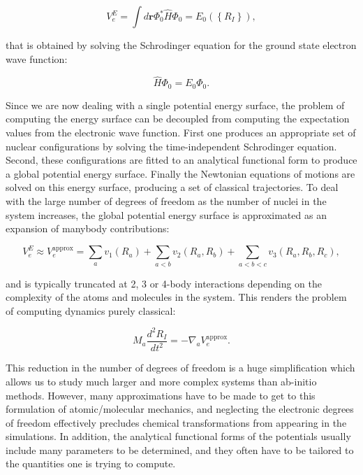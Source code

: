 $$ V_e^E = \int d\bm{r} \Phi_0^* \hat{H} \Phi_0 
    = E_0 \left(\left\{ R_I \right\}\right) , $$

that is obtained by solving the Schrodinger equation
for the ground state electron wave function:

$$ \hat{H} \Phi_0 = E_0 \Phi_0 . $$

Since we are now dealing with a single potential
energy surface, the problem of computing the energy surface
can be decoupled from computing the
expectation values from the electronic wave function.
First one produces an appropriate set of nuclear configurations
by solving the time-independent Schrodinger equation.
Second, these configurations are fitted to an analytical
functional form to produce a global potential energy surface.
Finally the Newtonian equations of motions are solved
on this energy surface, producing a set of classical trajectories.
To deal with the large number of degrees of freedom
as the number of nuclei in the system increases,
the global potential energy surface
is approximated as an expansion of manybody contributions:

$$ V_e^E \approx V_e^{\text{approx}} =
    \sum_a v_1(R_a) + \sum_{a < b} v_2(R_a, R_b)
    + \sum_{a < b < c} v_3(R_a, R_b, R_c) , $$

and is typically truncated at 2, 3 or 4-body interactions
depending on the complexity of the atoms and molecules in the system.
This renders the problem of computing dynamics purely classical:

$$ M_a \frac{d^2 R_I}{dt^2} = -\nabla_a V_e^{\text{approx}} . $$

This reduction in the number of degrees of freedom is a huge simplification
which allows us to study much larger and more complex systems
than ab-initio methods. However, many approximations have to be made
to get to this formulation of atomic/molecular mechanics, and neglecting
the electronic degrees of freedom effectively precludes chemical
transformations from appearing in the simulations.
In addition, the analytical functional forms of the potentials
usually include many parameters to be determined,
and they often have to be tailored to the quantities
one is trying to compute.

